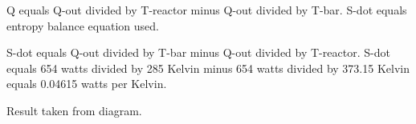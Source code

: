 Q equals Q-out divided by T-reactor minus Q-out divided by T-bar.  
S-dot equals entropy balance equation used.  

S-dot equals Q-out divided by T-bar minus Q-out divided by T-reactor.  
S-dot equals 654 watts divided by 285 Kelvin minus 654 watts divided by 373.15 Kelvin equals 0.04615 watts per Kelvin.  

Result taken from diagram.